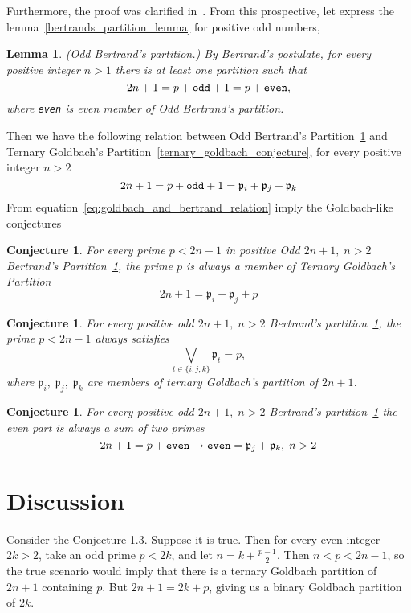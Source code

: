 \documentclass[12pt,letterpaper,oneside,reqno]{amsart}
\newtheorem{lem}{Lemma}[section]
\newtheorem{conj}[thm]{Conjecture}
\begin{document}
    Furthermore, the proof was clarified in~\cite{helfgott2015ternary}.
    From this prospective, let express the lemma~\ref{bertrands_partition_lemma} for positive odd numbers,
    \begin{lem}(Odd Bertrand's partition.)
        \label{bertrands_odd_partition_lemma}
        By Bertrand's postulate, for every positive integer $n>1$ there is at least one partition such that
        \[
            2n + 1 = p + \verb!odd! + 1 = p + \verb!even!,
        \]
        where \verb!even! is even member of Odd Bertrand's partition.
    \end{lem}
    Then we have the following relation between Odd Bertrand's Partition~\ref{bertrands_odd_partition_lemma} and
    Ternary Goldbach's Partition~\ref{ternary_goldbach_conjecture}, for every positive integer $n>2$
    \begin{equation}
        2n + 1 = p + \verb!odd! + 1 = \mathfrak{p}_i +  \mathfrak{p}_j + \mathfrak{p}_k
        \label{eq:goldbach_and_bertrand_relation}
    \end{equation}
    From equation~\eqref{eq:goldbach_and_bertrand_relation} imply the Goldbach-like conjectures
    \begin{conj}
        For every prime $p< 2n-1$ in positive Odd $2n+1, \; n>2$ Bertrand's Partition~\ref{bertrands_odd_partition_lemma},
        the prime $p$ is always a member of Ternary Goldbach's Partition
        \[
            2n+1 = \mathfrak{p}_i +  \mathfrak{p}_j + p
        \]
    \end{conj}
    \begin{conj}
        For every positive odd $2n+1, \; n>2$ Bertrand's partition~\ref{bertrands_odd_partition_lemma},
        the prime $p < 2n-1$ always satisfies
        \[
            \bigvee_{t \in \{i, j, k\}} \mathfrak{p}_t = p,
        \]
        where $\mathfrak{p}_i, \; \mathfrak{p}_j, \; \mathfrak{p}_k$ are members of ternary Goldbach's partition of $2n+1$.
    \end{conj}
    \begin{conj}
        For every positive odd $2n+1, \; n>2$ Bertrand's partition~\ref{bertrands_odd_partition_lemma}
        the even part is always a sum of two primes
        \[
            2n + 1 = p + \verb!even! \rightarrow \verb!even! = \mathfrak{p}_j + \mathfrak{p}_k, \; n > 2
        \]
    \end{conj}


    \section{Discussion}\label{sec:discussion}
    Consider the Conjecture 1.3.
    Suppose it is true.
    Then for every even integer $2k>2$, take an odd prime $p<2k$, and let $n=k+\frac{p-1}{2}$.
    Then $n<p<2n-1$, so the true scenario would imply that there is a ternary Goldbach partition of $2n+1$ containing $p$.
    But $2n+1=2k+p$, giving us a binary Goldbach partition of $2k$.
\end{document}
